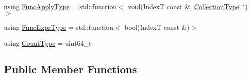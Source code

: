 \begin{DoxyCompactItemize}
\item 
using \hyperlink{structvt_1_1vrt_1_1collection_1_1_holder_ad90339cb0c4fe0d69f4e0100265a15d4}{Func\+Apply\+Type} = std\+::function$<$ void(IndexT const  \&, \hyperlink{structvt_1_1vrt_1_1collection_1_1_holder_ad940337a70ac576f960ea2d22a33f290}{Collection\+Type} $\ast$)$>$
\item 
using \hyperlink{structvt_1_1vrt_1_1collection_1_1_holder_a4d4364a2f3aa30c8a86cb08742a84e25}{Func\+Expr\+Type} = std\+::function$<$ bool(IndexT const  \&)$>$
\item 
using \hyperlink{structvt_1_1vrt_1_1collection_1_1_holder_afdfca52a996f6ac65e6f9e59035f2e3a}{Count\+Type} = uint64\+\_\+t
\end{DoxyCompactItemize}
\subsection*{Public Member Functions}
